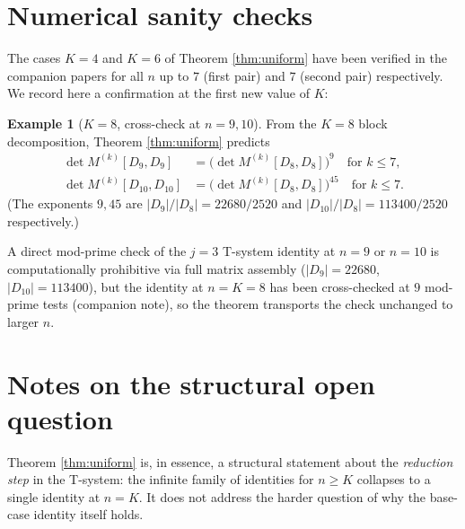 \documentclass[11pt]{article}
\theoremstyle{definition}
\newtheorem{example}[theorem]{Example}
\begin{document}
\section{Numerical sanity checks}

The cases $K=4$ and $K=6$ of Theorem \ref{thm:uniform} have been verified in the companion papers for all $n$ up to $7$ (first pair) and $7$ (second pair) respectively.  We record here a confirmation at the first new value of $K$:

\begin{example}[$K = 8$, cross-check at $n = 9, 10$]
From the $K = 8$ block decomposition, Theorem \ref{thm:uniform} predicts
\begin{align*}
\det M^{(k)}[D_9, D_9] &= \bigl(\det M^{(k)}[D_8, D_8]\bigr)^9 \quad \text{for } k \leq 7, \\
\det M^{(k)}[D_{10}, D_{10}] &= \bigl(\det M^{(k)}[D_8, D_8]\bigr)^{45} \quad \text{for } k \leq 7.
\end{align*}
(The exponents $9, 45$ are $|D_9|/|D_8| = 22680/2520$ and $|D_{10}|/|D_8| = 113400/2520$ respectively.)

A direct mod-prime check of the $j=3$ T-system identity at $n=9$ or $n=10$ is computationally prohibitive via full matrix assembly ($|D_9| = 22680$, $|D_{10}| = 113400$), but the identity at $n = K = 8$ has been cross-checked at $9$ mod-prime tests (companion note), so the theorem transports the check unchanged to larger $n$.
\end{example}

\section{Notes on the structural open question}

Theorem \ref{thm:uniform} is, in essence, a structural statement about the \emph{reduction step} in the T-system: the infinite family of identities for $n \geq K$ collapses to a single identity at $n = K$.  It does not address the harder question of why the base-case identity itself holds.
\end{document}
